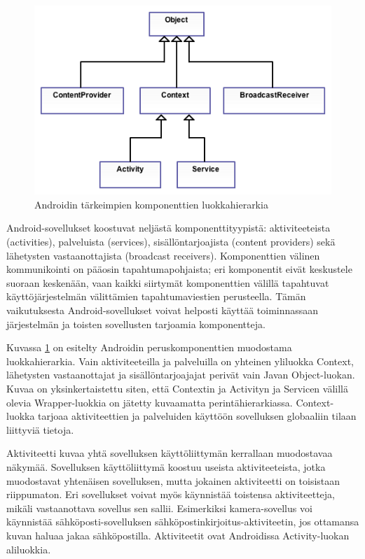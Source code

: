\begin{figure}[htb]
\includegraphics[width=130mm]{class_diagram.png}
\caption{Androidin tärkeimpien komponenttien luokkahierarkia} \label{class_diagram}
\end{figure}

Android-sovellukset koostuvat neljästä komponenttityypistä: aktiviteeteista (activities), palveluista (services), sisällöntarjoajista (content providers) sekä lähetysten vastaanottajista (broadcast receivers). Komponenttien välinen kommunikointi on pääosin tapahtumapohjaista; eri komponentit eivät keskustele suoraan keskenään, vaan kaikki siirtymät komponenttien välillä tapahtuvat käyttöjärjestelmän välittämien tapahtumaviestien perusteella. Tämän vaikutuksesta Android-sovellukset voivat helposti käyttää toiminnassaan järjestelmän ja toisten sovellusten tarjoamia komponentteja.

Kuvassa \ref{class_diagram} on esitelty Androidin peruskomponenttien muodostama luokkahierarkia. Vain aktiviteeteilla ja palveluilla on yhteinen yliluokka Context, lähetysten vastaanottajat ja sisällöntarjoajajat perivät vain Javan Object-luokan. Kuvaa on yksinkertaistettu siten, että Contextin ja Activityn ja Servicen välillä olevia Wrapper-luokkia on jätetty kuvaamatta perintähierarkiassa. Context-luokka tarjoaa aktiviteettien ja palveluiden käyttöön sovelluksen globaaliin tilaan liittyviä tietoja.

Aktiviteetti kuvaa yhtä sovelluksen käyttöliittymän kerrallaan muodostavaa näkymää. Sovelluksen käyttöliittymä koostuu useista aktiviteeteista, jotka muodostavat yhtenäisen sovelluksen, mutta jokainen aktiviteetti on toisistaan riippumaton. Eri sovellukset voivat myös käynnistää toistensa aktiviteetteja, mikäli vastaanottava sovellus sen sallii. Esimerkiksi kamera-sovellus voi käynnistää sähköposti-sovelluksen sähköpostinkirjoitus-aktiviteetin, jos ottamansa kuvan haluaa jakaa sähköpostilla. Aktiviteetit ovat Androidissa Activity-luokan aliluokkia.

